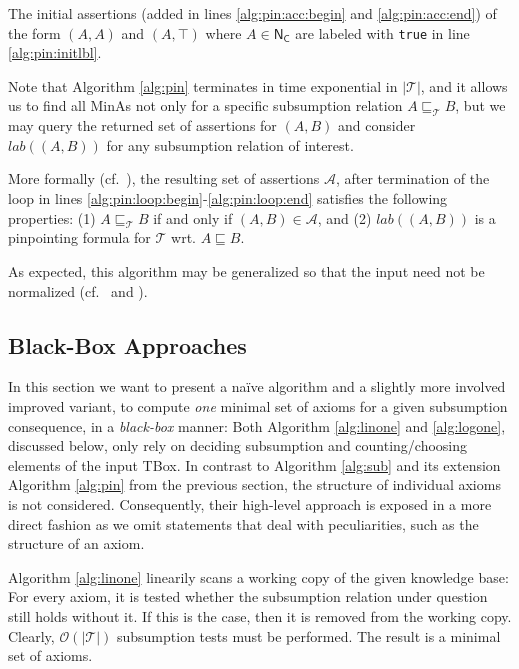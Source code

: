 \documentclass{llncs}
\newcommand{\tb}{\ensuremath{\mathcal{T}}\xspace} %
\newcommand{\nc}{\ensuremath{\mathsf{N_C}}\xspace} %
\newcommand{\subsume}{\sqsubseteq}
\begin{document}
The initial assertions (added in lines \ref{alg:pin:acc:begin} and \ref{alg:pin:acc:end}) of the form $(A, A)$ and $(A, \top)$ where $A \in \nc$ are labeled with \texttt{true} in line \ref{alg:pin:initlbl}.

Note that Algorithm \ref{alg:pin} terminates in time exponential in $|\tb|$, and it allows us to find all MinAs not only for a specific subsumption relation $A \subsume_\tb B$, but we may query the returned set of assertions for $(A, B)$ and consider $lab((A, B))$ for any subsumption relation of interest.

More formally (cf.~\cite[Thm.~2]{orig1,orig2}), the resulting set of assertions $\mathcal{A}$, after termination of the loop in lines \ref{alg:pin:loop:begin}-\ref{alg:pin:loop:end} satisfies the following properties: (1) $A \subsume_\tb B$ if and only if $(A, B) \in \mathcal{A}$, and (2) $lab((A,B))$ is a pinpointing formula for $\tb$ wrt. $A \subsume B$.

As expected, this algorithm may be generalized so that the input need not be normalized (cf.~\cite[Sec.~3]{orig1,orig2} and \cite[Sec.~5.2, p.~107]{meng-phd}).

\subsection{Black-Box Approaches}
\label{sec:black}

In this section we want to present a na\"{i}ve algorithm and a slightly more involved improved variant, to compute \emph{one} minimal set of axioms for a given subsumption consequence, in a \emph{black-box} manner: Both Algorithm \ref{alg:linone} and \ref{alg:logone}, discussed below, only rely on deciding subsumption and counting/choosing elements of the input TBox. In contrast to Algorithm \ref{alg:sub} and its extension Algorithm \ref{alg:pin} from the previous section, the structure of individual axioms is not considered. Consequently, their high-level approach is exposed in a more direct fashion as we omit statements that deal with peculiarities, such as the structure of an axiom.

Algorithm \ref{alg:linone} linearily scans a working copy of the given knowledge base: For every axiom, it is tested whether the subsumption relation under question still holds without it. If this is the case, then it is removed from the working copy. Clearly, $\mathcal{O}(|\tb|)$ subsumption tests must be performed. The result is a minimal set of axioms.
\end{document}
